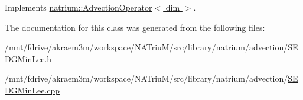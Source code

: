 Implements \hyperlink{classnatrium_1_1AdvectionOperator_aca14260bae100874b0050a2a96d7a564}{natrium::AdvectionOperator$<$ dim $>$}.

The documentation for this class was generated from the following files:\begin{DoxyCompactItemize}
\item 
/mnt/fdrive/akraem3m/workspace/NATriuM/src/library/natrium/advection/\hyperlink{SEDGMinLee_8h}{SEDGMinLee.h}\item 
/mnt/fdrive/akraem3m/workspace/NATriuM/src/library/natrium/advection/\hyperlink{SEDGMinLee_8cpp}{SEDGMinLee.cpp}\end{DoxyCompactItemize}
